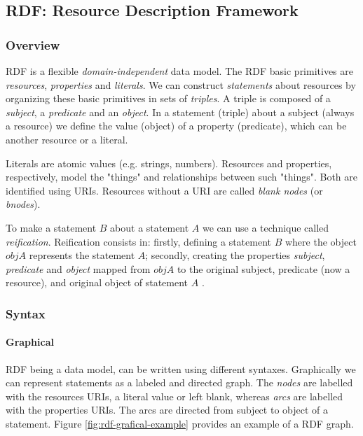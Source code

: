 \subsection{RDF: Resource Description Framework}
\label{ch2:sec:semantic-web:rdf}

\subsubsection{Overview}
\gls{RDF} \autocite{W3c_undated-vq} is a flexible \emph{domain-independent} data model. The \gls{RDF} basic primitives are \emph{resources}, \emph{properties} and \emph{literals}. We can construct \emph{statements} about resources by organizing these basic primitives in sets of \emph{triples}. A triple is composed of a \emph{subject}, a \emph{predicate} and an \emph{object}. In a statement (triple) about a subject (always a resource) we define the value (object) of a property (predicate), which can be another resource or a literal.

Literals are atomic values (e.g. strings, numbers). Resources and properties, respectively, model the "things" and relationships between such "things". Both are identified using \gls{URI}s. Resources without a \gls{URI} are called \emph{blank nodes} (or \emph{bnodes}).

To make a statement $B$ about a statement $A$ we can use a technique called \emph{reification}. Reification consists in: firstly, defining a statement $B$ where the object $objA$ represents the statement $A$; secondly, creating the properties \emph{subject}, \emph{predicate} and \emph{object} mapped from $objA$ to the original subject, predicate (now a resource), and original object of statement $A$ \autocite{Antoniou2012-nj}.

\subsubsection{Syntax}

\paragraph{Graphical} \gls{RDF} being a data model, can be written using different syntaxes. Graphically we can represent statements as a labeled and directed graph. The \emph{nodes} are labelled with the resources \gls{URI}s, a literal value or left blank, whereas \emph{arcs} are labelled with the properties \gls{URI}s. The arcs are directed from subject to object of a statement. Figure \ref{fig:rdf-grafical-example} provides an example of a \gls{RDF} graph.


